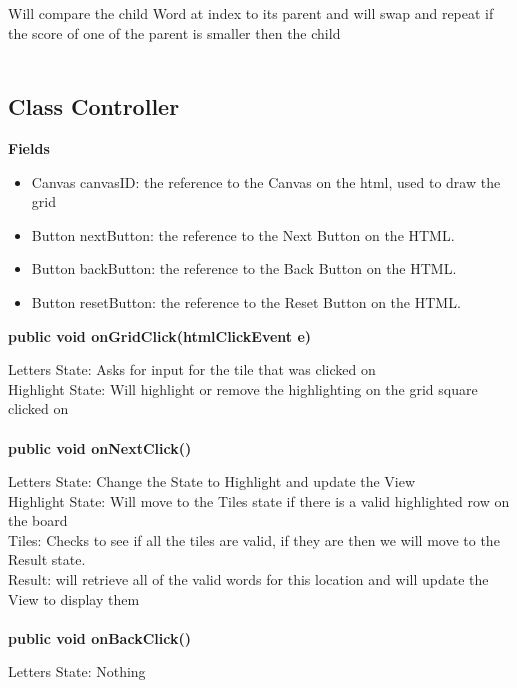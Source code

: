 \documentclass[11pt]{article}
\begin{document}
Will compare the child Word at index to its parent and will swap and repeat if the score of one of the parent is smaller then the child\\\\

\subsection{Class Controller \\}
\textbf{Fields\\}
\begin{itemize}
	\item Canvas canvasID: the reference to the Canvas on the html, used to draw the grid
	\item Button nextButton: the reference to the Next Button on the HTML.
	\item Button backButton: the reference to the Back Button on the HTML.
	\item Button resetButton: the reference to the Reset Button on the HTML.
\end{itemize}
%
\textbf{public void onGridClick(htmlClickEvent e)\\}

Letters State: Asks for input for the tile that was clicked on\\

Highlight State: Will highlight or remove the highlighting on the grid square clicked on  \\\\
%
\textbf{public void onNextClick()\\}

Letters State: Change the State to Highlight and update the View\\

Highlight State: Will move to the Tiles state if there is a valid highlighted row on the board\\

Tiles: Checks to see if all the tiles are valid, if they are then we will move to the Result state. \\

Result: will retrieve all of the valid words for this location and will update the View to display them\\\\
%
\textbf{public void onBackClick()\\}

Letters State: Nothing\\
\end{document}

